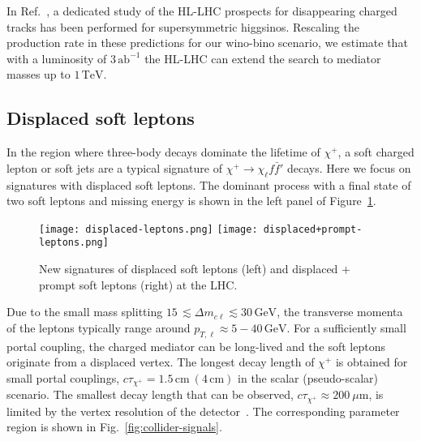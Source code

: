 \documentclass[nofootinbib,prd,aps,superscriptaddress,preprintnumbers]{revtex4}
\begin{document}
In Ref.~\cite{Mahbubani:2017gjh}, a dedicated study of the HL-LHC prospects for disappearing charged tracks has been performed for supersymmetric higgsinos. Rescaling the production rate in these predictions for our wino-bino scenario, we estimate that with a luminosity of $3\,\text{ab}^{-1}$ the HL-LHC can extend the search to mediator masses up to $1\,\text{TeV}$.

\subsection{Displaced soft leptons}\noindent In the region where three-body decays dominate the lifetime of $\chi^+$, a soft charged lepton or soft jets are a typical signature of $\chi^+\to \chi_\ell f\bar{f}'$ decays. Here we focus on signatures with displaced soft leptons. The dominant process with a final state of two soft leptons and missing energy is shown in the left panel of Figure~\ref{fig:production}.
\begin{figure}[!t]
\centering
\texttt{[image: displaced-leptons.png]} \hspace*{0.5cm} \texttt{[image: displaced+prompt-leptons.png]}
\caption{\label{fig:production}New signatures of displaced soft leptons (left) and displaced $+$ prompt soft leptons (right) at the LHC.}
\end{figure}
 Due to the small mass splitting $15\,\lesssim \Delta m_{c\ell} \lesssim 30\,\text{GeV}$, the transverse momenta of the leptons typically range around $p_{T,\ell} \approx 5-40\,\text{GeV}$. For a sufficiently small portal coupling, the charged mediator can be long-lived and the soft leptons originate from a displaced vertex. The longest decay length of $\chi^+$ is obtained for small portal couplings, $c \tau_{\chi^+} = 1.5\,\text{cm}\ (4\,\text{cm})$ in the scalar (pseudo-scalar) scenario. The smallest decay length that can be observed, $c \tau_{\chi^+} \approx 200~\mu\text{m}$, is limited by the vertex resolution of the detector~\cite{CMS:2016isf}. The corresponding parameter region is shown in Fig.~\ref{fig:collider-signals}.
\end{document}
